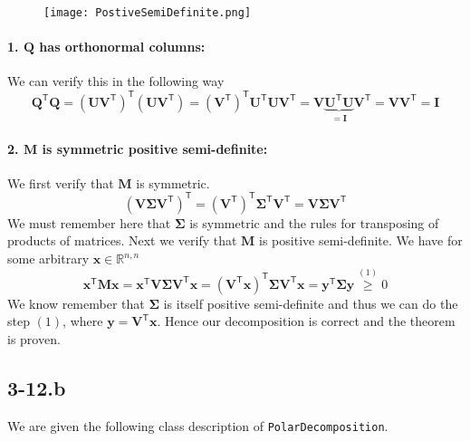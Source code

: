 \documentclass{article}
\begin{document}
\begin{figure}[!hbt]
    \centering
\texttt{[image: PostiveSemiDefinite.png]}
\end{figure}


\paragraph{1. $\mathbf{Q}$ has orthonormal columns:} We can verify this in the following way
\begin{equation*}
    \mathbf{Q}^{\mathsf{T}}\mathbf{Q} = \left(\mathbf{U}\mathbf{V}^{\mathsf{T}}\right)^{\mathsf{T}}\left(\mathbf{U}\mathbf{V}^{\mathsf{T}}\right) = \left(\mathbf{V}^{\mathsf{T}}\right)^{\mathsf{T}}\mathbf{U}^{\mathsf{T}}\mathbf{U}\mathbf{V}^{\mathsf{T}} = \mathbf{V}\underbrace{\mathbf{U}^{\mathsf{T}}\mathbf{U}}_{= \mathbf{I}}\mathbf{V}^{\mathsf{T}} = \mathbf{V}\mathbf{V}^{\mathsf{T}} = \mathbf{I}
\end{equation*}
\paragraph{2. $\mathbf{M}$ is symmetric positive semi-definite: } We first verify that $\mathbf{M}$ is symmetric.
\begin{equation*}
    \left(\mathbf{V}\mathbf{\Sigma}\mathbf{V}^{\mathsf{T}} \right)^{\mathsf{T}} = \left(\mathbf{V}^{\mathsf{T}}\right)^{\mathsf{T}}\mathbf{\Sigma}^{\mathsf{T}}\mathbf{V}^{\mathsf{T}} = \mathbf{V}\mathbf{\Sigma}\mathbf{V}^{\mathsf{T}}
\end{equation*}
We must remember here that $\mathbf{\Sigma}$ is symmetric and the rules for transposing of products of matrices. Next we verify that $\mathbf{M}$ is positive semi-definite. We have for some arbitrary $\mathbf{x}\in \mathbb{R}^{n,n}$
\begin{equation*}
    \mathbf{x}^{\mathsf{T}}\mathbf{M}\mathbf{x} =\mathbf{x}^{\mathsf{T}}\mathbf{V}\mathbf{\Sigma}\mathbf{V}^{\mathsf{T}}\mathbf{x} = \left(\mathbf{V}^{\mathsf{T}}\mathbf{x}\right)^{\mathsf{T}}\mathbf{\Sigma}\mathbf{V}^{\mathsf{T}}\mathbf{x} =\mathbf{y}^{\mathsf{T}}\mathbf{\Sigma}\mathbf{y}  \overset{(1)}{\geq} 0
\end{equation*}
We know remember that $\mathbf{\Sigma}$ is itself positive semi-definite and thus we can do the step $(1)$, where $\mathbf{y} = \mathbf{V}^{\mathsf{T}}\mathbf{x}$. Hence our decomposition is correct and the theorem is proven.
\subsection*{3-12.b}
We are given the following class description of \verb|PolarDecomposition|.
\end{document}

